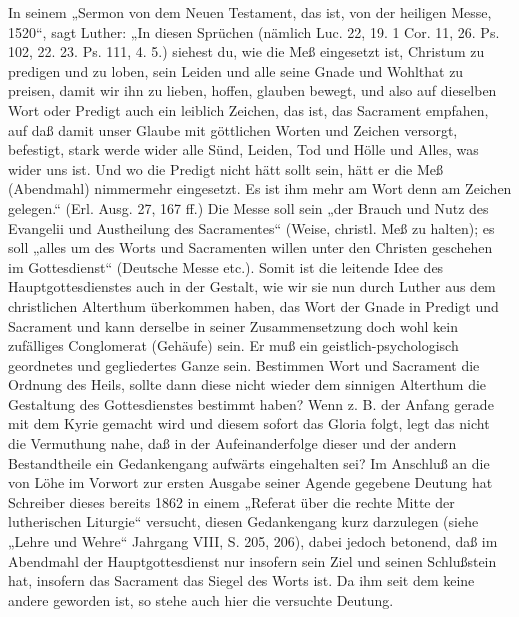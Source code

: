 In seinem „Sermon von dem Neuen Testament, das ist, von der heiligen Messe, 1520“, sagt Luther: „In diesen Sprüchen (nämlich Luc. 22, 19. 1 Cor. 11, 26. Ps. 102, 22. 23. Ps. 111, 4. 5.) siehest du, wie die Meß eingesetzt ist, Christum zu predigen und zu loben, sein Leiden und alle seine Gnade und Wohlthat zu preisen, damit wir ihn zu lieben, hoffen, glauben bewegt, und also auf dieselben Wort oder Predigt auch ein leiblich Zeichen, das ist, das Sacrament empfahen, auf daß damit unser Glaube mit göttlichen Worten und Zeichen versorgt, befestigt, stark werde wider alle Sünd, Leiden, Tod und Hölle und Alles, was wider uns ist. Und wo die Predigt nicht hätt sollt sein, hätt er die Meß (Abendmahl) nimmermehr eingesetzt. Es ist ihm mehr am Wort denn am Zeichen gelegen.“ (Erl. Ausg. 27, 167 ff.) Die Messe soll sein „der Brauch und Nutz des Evangelii und Austheilung des Sacramentes“ (Weise, christl. Meß zu halten); es soll „alles um des Worts und Sacramenten willen unter den Christen geschehen im Gottesdienst“ (Deutsche Messe etc.). Somit ist die leitende Idee des Hauptgottesdienstes auch in der Gestalt, wie wir sie nun durch Luther aus dem christlichen Alterthum überkommen haben, das Wort der Gnade in Predigt und Sacrament und kann derselbe in seiner Zusammensetzung doch wohl kein zufälliges Conglomerat (Gehäufe) sein. Er muß ein geistlich-psychologisch geordnetes und gegliedertes Ganze sein.
Bestimmen Wort und Sacrament die Ordnung des Heils, sollte dann diese nicht wieder dem sinnigen Alterthum die Gestaltung des Gottesdienstes bestimmt haben? Wenn z. B. der Anfang gerade mit dem Kyrie gemacht wird und diesem sofort das Gloria folgt, legt das nicht die Vermuthung nahe, daß in der Aufeinanderfolge dieser und der andern Bestandtheile ein Gedankengang aufwärts eingehalten sei? Im Anschluß an die von Löhe im Vorwort zur ersten Ausgabe seiner Agende gegebene Deutung hat Schreiber dieses bereits 1862 in einem „Referat über die rechte Mitte der lutherischen Liturgie“ versucht, diesen Gedankengang kurz darzulegen (siehe „Lehre und Wehre“ Jahrgang VIII, S. 205, 206), dabei jedoch betonend, daß im Abendmahl der Hauptgottesdienst nur insofern sein Ziel und seinen Schlußstein hat, insofern das Sacrament das Siegel des Worts ist. Da ihm seit dem keine andere geworden ist, so stehe auch hier die versuchte Deutung.

